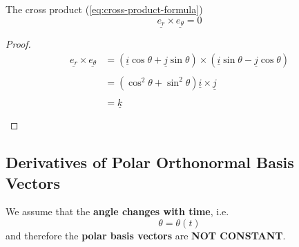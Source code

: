 \clearpage

\begin{theorem}
	The cross product (\ref{eq:cross-product-formula})
	$$\underline{e_r} \times \underline{e_{\theta}} = 0$$
\end{theorem}
\begin{proof}
	$$\begin{aligned} \underline{e_{r}} \times \underline{e_{\theta}} & = (\underline{i}\cos\theta + \underline{j}\sin\theta) \times ( \underline{i}\sin\theta - \underline{j}\cos\theta) \\ \\ &= (\cos^{2}\theta+ \sin^{2}\theta)\underline{i} \times \underline{j} \\ \\
                                                                & = \underline{k}                                                                                                   \\ \\\end{aligned}$$
\end{proof}

\subsection{Derivatives of Polar Orthonormal Basis Vectors}
We assume that the {\bf angle changes with time}, i.e.
$$\theta = \theta\left( t \right) $$
and therefore the {\bf polar basis vectors} are {\bf NOT CONSTANT}.

